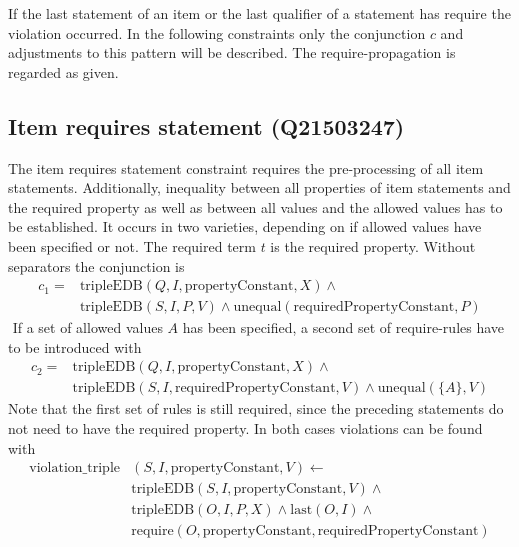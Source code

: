 \documentclass[hyperref,bachelorofscience,fleqn]{cgvpub}
\begin{document}
If the last statement of an item or the last qualifier of a statement has require the violation occurred. In the following constraints only the conjunction \(c\) and adjustments to this pattern will be described. The require-propagation is regarded as given.

\subsection{Item requires statement (Q21503247)}
The item requires statement constraint requires the pre-processing of all item statements. Additionally, inequality between all properties of item statements and the required property as well as between all values and the allowed values has to be established. It occurs in two varieties, depending on if allowed values have been specified or not. The required term \(t\) is the  required property. Without separators the conjunction is
\begin{equation*}
\begin{split}
c_1 = &\text{tripleEDB}(Q, I, \text{propertyConstant}, X) \wedge \\
&\text{tripleEDB}(S, I, P, V) \wedge \text{unequal}(\text{requiredPropertyConstant}, P)
\end{split}
\end{equation*} \(\)
If a set of allowed values \(A\) has been specified, a second set of require-rules have to be introduced with
\begin{equation*}
\begin{split}
c_2 = &\text{tripleEDB}(Q, I, \text{propertyConstant}, X) \wedge \\
&\text{tripleEDB}(S, I, \text{requiredPropertyConstant}, V) \wedge \text{unequal}(\{A\}, V)
\end{split}
\end{equation*}
Note that the first set of rules is still required, since the preceding statements do not need to have the required property. In both cases violations can be found with
\begin{equation*}
\begin{split}
\text{violation\_triple}&(S, I, \text{propertyConstant}, V) \leftarrow \\
&\text{tripleEDB}(S, I, \text{propertyConstant}, V) \wedge \\
&\text{tripleEDB}(O, I, P, X) \wedge \text{last}(O, I) \wedge \\
&\text{require}(O, \text{propertyConstant}, \text{requiredPropertyConstant})
\end{split}
\end{equation*}
\end{document}
